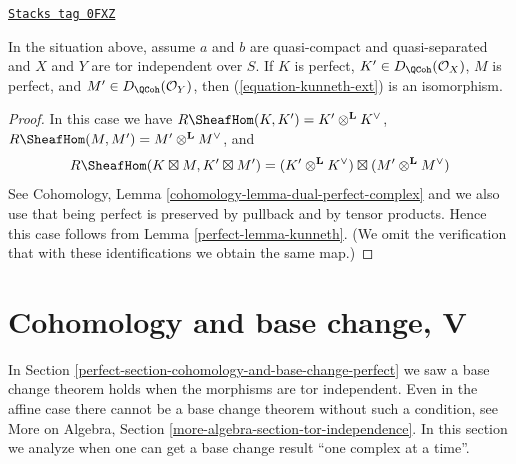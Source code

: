 \begin{lemma}
\label{perfect-lemma-kunneth-Ext}
\href{https://stacks.math.columbia.edu/tag/0FXZ}{\texttt{Stacks tag 0FXZ}}

In the situation above, assume $a$ and $b$ are quasi-compact and
quasi-separated and $X$ and $Y$ are tor independent over $S$.
If $K$ is perfect, $K' \in D_\QCoh(\mathcal{O}_X)$, $M$ is perfect, and
$M' \in D_\QCoh(\mathcal{O}_Y)$, then (\ref{equation-kunneth-ext})
is an isomorphism.
\end{lemma}

\begin{proof}

In this case we have $R\SheafHom(K, K') = K' \otimes^\mathbf{L} K^\vee$,
$R\SheafHom(M, M') = M' \otimes^\mathbf{L} M^\vee$, and
$$
R\SheafHom(K \boxtimes M, K' \boxtimes M') =
(K' \otimes^\mathbf{L} K^\vee) \boxtimes
(M' \otimes^\mathbf{L} M^\vee)
$$
See Cohomology, Lemma \ref{cohomology-lemma-dual-perfect-complex}
and we also use that being perfect is preserved by pullback
and by tensor products.
Hence this case follows from Lemma \ref{perfect-lemma-kunneth}.
(We omit the verification that with these identifications
we obtain the same map.)
\end{proof}

\section{Cohomology and base change, V}
\label{perfect-section-cohomology-base-change}
In Section \ref{perfect-section-cohomology-and-base-change-perfect}
we saw a base change theorem holds when the morphisms are tor independent.
Even in the affine case there cannot be a base change theorem without such
a condition, see
More on Algebra, Section \ref{more-algebra-section-tor-independence}.
In this section we analyze when one can get a base change result
``one complex at a time''.

